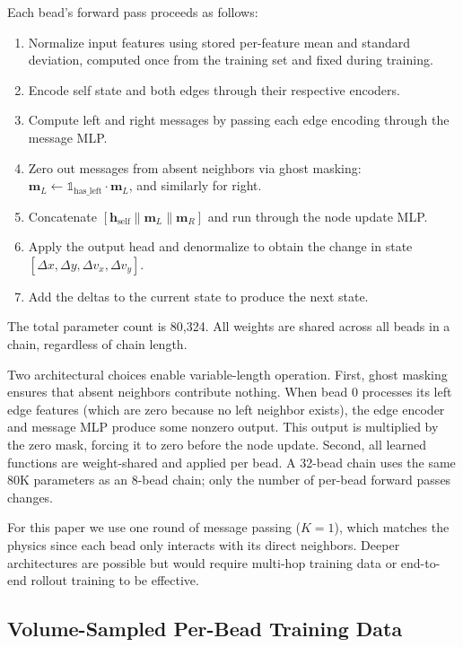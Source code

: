 \documentclass[conference]{IEEEtran}
\begin{document}
Each bead's forward pass proceeds as follows:
\begin{enumerate}
    \item Normalize input features using stored per-feature mean and standard deviation, computed once from the training set and fixed during training.
    \item Encode self state and both edges through their respective encoders.
    \item Compute left and right messages by passing each edge encoding through the message MLP.
    \item Zero out messages from absent neighbors via ghost masking: $\mathbf{m}_L \leftarrow \mathbb{1}_{\text{has\_left}} \cdot \mathbf{m}_L$, and similarly for right.
    \item Concatenate $[\mathbf{h}_{\text{self}} \| \mathbf{m}_L \| \mathbf{m}_R]$ and run through the node update MLP.
    \item Apply the output head and denormalize to obtain the change in state $[\Delta x, \Delta y, \Delta v_x, \Delta v_y]$.
    \item Add the deltas to the current state to produce the next state.
\end{enumerate}

The total parameter count is 80{,}324. All weights are shared across all beads in a chain, regardless of chain length.

Two architectural choices enable variable-length operation. First, ghost masking ensures that absent neighbors contribute nothing. When bead 0 processes its left edge features (which are zero because no left neighbor exists), the edge encoder and message MLP produce some nonzero output. This output is multiplied by the zero mask, forcing it to zero before the node update. Second, all learned functions are weight-shared and applied per bead. A 32-bead chain uses the same 80K parameters as an 8-bead chain; only the number of per-bead forward passes changes.

For this paper we use one round of message passing ($K=1$), which matches the physics since each bead only interacts with its direct neighbors. Deeper architectures are possible but would require multi-hop training data or end-to-end rollout training to be effective.

\subsection{Volume-Sampled Per-Bead Training Data}
\end{document}
